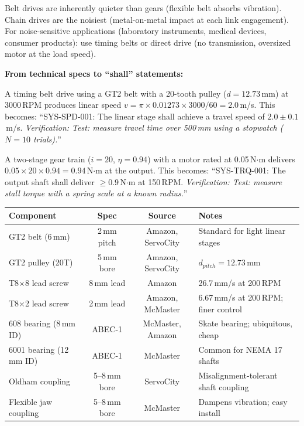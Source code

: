 Belt drives are inherently quieter than gears (flexible belt absorbs vibration). Chain drives are the noisiest (metal-on-metal impact at each link engagement). For noise-sensitive applications (laboratory instruments, medical devices, consumer products): use timing belts or direct drive (no transmission, oversized motor at the load speed).
\begin{keyconceptbox}
\textbf{From technical specs to ``shall'' statements:}

A timing belt drive using a GT2 belt with a 20-tooth pulley ($d = 12.73$\,mm) at 3000\,RPM produces linear speed $v = \pi \times 0.01273 \times 3000/60 = 2.0$\,m/s. This becomes: ``SYS-SPD-001: The linear stage shall achieve a travel speed of $2.0 \pm 0.1$\,m/s. \emph{Verification: Test: measure travel time over 500\,mm using a stopwatch ($N = 10$ trials).}''

A two-stage gear train ($i = 20$, $\eta = 0.94$) with a motor rated at 0.05\,N$\cdot$m delivers $0.05 \times 20 \times 0.94 = 0.94$\,N$\cdot$m at the output. This becomes: ``SYS-TRQ-001: The output shaft shall deliver $\geq 0.9$\,N$\cdot$m at 150\,RPM. \emph{Verification: Test: measure stall torque with a spring scale at a known radius.}''
\end{keyconceptbox}

\begin{quickrefbox}
\begin{table}[H]\centering\small
\begin{tabularx}{\linewidth}{l c c X}
\toprule
\textbf{Component} & \textbf{Spec} & \textbf{Source} & \textbf{Notes} \\
\midrule
GT2 belt (6\,mm) & 2\,mm pitch & Amazon, ServoCity & Standard for light linear stages \\
GT2 pulley (20T) & 5\,mm bore & Amazon, ServoCity & $d_{pitch} = 12.73$\,mm \\
T8$\times$8 lead screw & 8\,mm lead & Amazon & 26.7\,mm/s at 200\,RPM \\
T8$\times$2 lead screw & 2\,mm lead & Amazon, McMaster & 6.67\,mm/s at 200\,RPM; finer control \\
608 bearing (8\,mm ID) & ABEC-1 & McMaster, Amazon & Skate bearing; ubiquitous, cheap \\
6001 bearing (12\,mm ID) & ABEC-1 & McMaster & Common for NEMA 17 shafts \\
Oldham coupling & 5--8\,mm bore & ServoCity & Misalignment-tolerant shaft coupling \\
Flexible jaw coupling & 5--8\,mm bore & McMaster & Dampens vibration; easy install \\
\bottomrule
\end{tabularx}
\end{table}
\end{quickrefbox}

